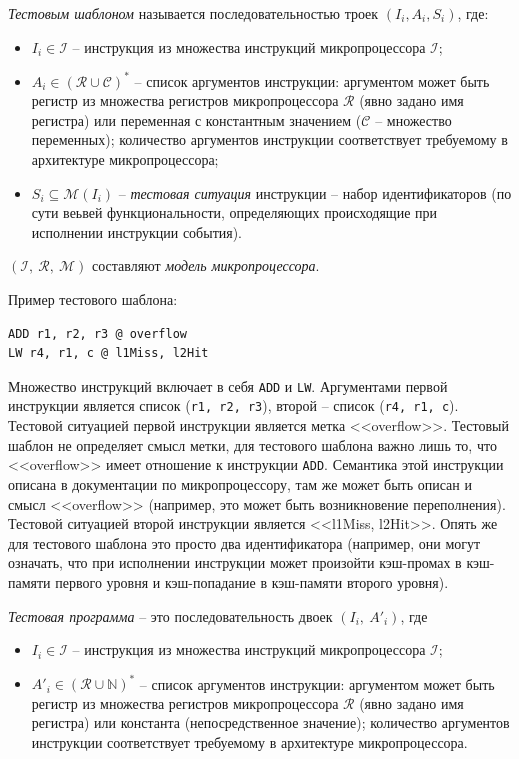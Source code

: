 \emph{Тестовым шаблоном} называется последовательностью троек $(I_i,
A_i, S_i)$, где:
\begin{itemize}
  \item $I_i \in \mathcal{I}$ -- инструкция из множества инструкций
микропроцессора $\mathcal{I}$;
  \item $A_i \in (\mathcal{R} \cup \mathcal{C})^*$ -- список аргументов
  инструкции: аргументом может быть регистр из множества регистров
  микропроцессора $\mathcal{R}$ (явно задано имя регистра) или
  переменная с константным значением ($\mathcal{C}$ -- множество
  переменных); количество аргументов инструкции соответствует
  требуемому в архитектуре микропроцессора;
  \item $S_i \subseteq \mathcal{M}(I_i)$ -- \emph{тестовая ситуация} инструкции -- набор идентификаторов (по сути веьвей функциональности, определяющих происходящие при исполнении инструкции события).
\end{itemize}

$(\mathcal{I},~\mathcal{R},~\mathcal{M})$ составляют \emph{модель микропроцессора}.

Пример тестового шаблона:
\begin{verbatim}
ADD r1, r2, r3 @ overflow
LW r4, r1, c @ l1Miss, l2Hit
\end{verbatim}
Множество инструкций включает в себя \texttt{ADD} и \texttt{LW}.
Аргументами первой инструкции является список (\texttt{r1, r2, r3}),
второй -- список (\texttt{r4, r1, c}). Тестовой ситуацией первой
инструкции является метка <<overflow>>. Тестовый шаблон не определяет смысл метки, для тестового шаблона важно лишь то, что <<overflow>> имеет отношение к инструкции \texttt{ADD}. Семантика этой инструкции описана в документации по микропроцессору, там же может быть описан и смысл <<overflow>> (например, это может быть возникновение переполнения).
Тестовой ситуацией второй инструкции является <<l1Miss, l2Hit>>. Опять же для тестового шаблона это просто два идентификатора (например, они могут означать, что при исполнении инструкции может произойти кэш-промах в кэш-памяти первого уровня и кэш-попадание в кэш-памяти второго уровня).

\emph{Тестовая программа} -- это последовательность двоек $(I_i,~A'_i)$, где
\begin{itemize}
  \item $I_i \in \mathcal{I}$ -- инструкция из множества инструкций
микропроцессора $\mathcal{I}$;
  \item $A'_i \in (\mathcal{R} \cup \mathds{N})^*$ -- список
  аргументов инструкции: аргументом может быть регистр из множества
  регистров микропроцессора $\mathcal{R}$ (явно задано имя регистра)
  или константа (непосредственное значение); количество аргументов
  инструкции соответствует требуемому в архитектуре микропроцессора.
\end{itemize}

